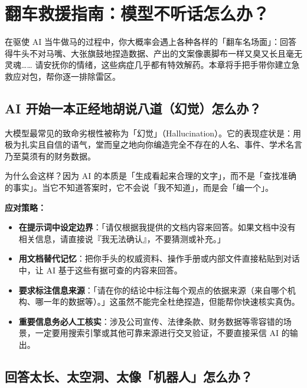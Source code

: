 % 
% 


\chapter{翻车救援指南：模型不听话怎么办？}
\label{ch:troubleshooting}

在驱使 AI 当牛做马的过程中，你大概率会遇上各种各样的「翻车名场面」：回答得牛头不对马嘴、大张旗鼓地捏造数据、产出的文案像裹脚布一样又臭又长且毫无灵魂……
请安抚你的情绪，这些病症几乎都有特效解药。本章将手把手带你建立急救应对包，帮你逐一排除雷区。

\section{AI 开始一本正经地胡说八道（幻觉）怎么办？}

大模型最常见的致命劣根性被称为「幻觉」（Hallucination）。它的表现症状是：用极为扎实且自信的语气，堂而皇之地向你编造完全不存在的人名、事件、学术名言乃至莫须有的财务数据。

为什么会这样？因为 AI 的本质是「生成看起来合理的文字」，而不是「查找准确的事实」。当它不知道答案时，它不会说「我不知道」，而是会「编一个」。

\textbf{应对策略：}

\begin{itemize}
  \item \textbf{在提示词中设定边界}：「请仅根据我提供的文档内容来回答。如果文档中没有相关信息，请直接说『我无法确认』，不要猜测或补充。」
  \item \textbf{用文档替代记忆}：把你手头的权威资料、操作手册或内部文件直接粘贴到对话中，让 AI 基于这些有据可查的内容来回答。
  \item \textbf{要求标注信息来源}：「请在你的结论中标注每个观点的依据来源（来自哪个机构、哪一年的数据等）。」这虽然不能完全杜绝捏造，但能帮你快速核实真伪。
  \item \textbf{重要信息务必人工核实}：涉及公司宣传、法律条款、财务数据等零容错的场景，一定要用搜索引擎或其他可靠来源进行交叉验证，不要直接采信 AI 的输出。
\end{itemize}

\section{回答太长、太空洞、太像「机器人」怎么办？}

